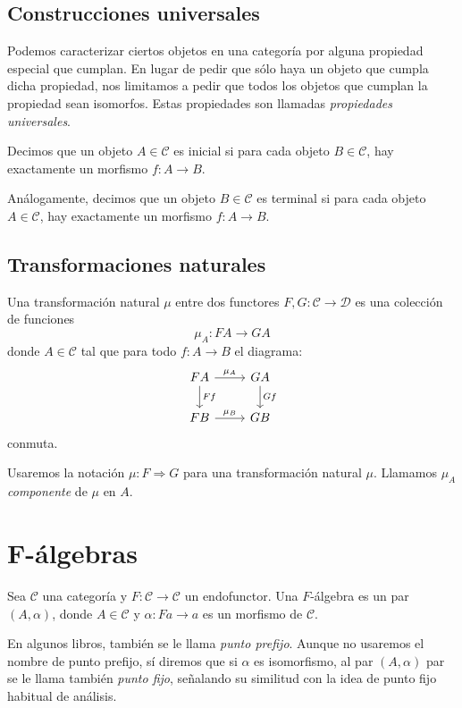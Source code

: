 \documentclass[12pt, twoside]{book}
\newcommand{\cat}{{\mathcal{C}}}
\begin{document}
\section{Construcciones universales}
Podemos caracterizar ciertos objetos en una categoría por alguna propiedad especial que cumplan. En lugar de pedir que sólo haya un objeto que cumpla dicha propiedad, nos limitamos a pedir que todos los objetos que cumplan la propiedad sean isomorfos. Estas propiedades son llamadas \emph{propiedades universales}.

\begin{definition}
Decimos que un objeto $A \in \cat$ es inicial si para cada objeto $B \in \cat$, hay exactamente un morfismo $f \colon A \to B$.

Análogamente, decimos que un objeto $B \in \cat$ es terminal si para cada objeto $A \in \cat$, hay exactamente un morfismo $f \colon A \to B$.
\end{definition}

\section{Transformaciones naturales}
\begin{definition}
Una transformación natural $\mu$ entre dos functores $F, G \colon \cat \to \mathcal{D}$ es una colección de funciones
\[ \mu_A \colon F A \to G A \]
donde $A \in \cat$ tal que para todo $f \colon A \to B$ el diagrama:
\[
\begin{tikzcd}
F A \arrow[r,"\mu_A"] \arrow[d,"F f"] & G A \arrow[d,"G f"]\\
F B \arrow[r,"\mu_B"] & G B
\end{tikzcd}
\]
conmuta.
\end{definition}

Usaremos la notación $\mu \colon F \Rightarrow G$ para una transformación natural $\mu$.
Llamamos $\mu_A$ \emph{componente} de $\mu$ en $A$.

\chapter{F-álgebras}
\begin{definition}
Sea $\cat$ una categoría y $F \colon \cat \to \cat$ un endofunctor.
Una $F$-álgebra es un par $(A,\alpha)$, donde $A \in \cat$ y $\alpha \colon F a \to a$ es un morfismo de $\cat$.
\end{definition}

En algunos libros, también se le llama \emph{punto prefijo}.
Aunque no usaremos el nombre de punto prefijo, sí diremos que si $\alpha$ es isomorfismo, al par $(A,\alpha)$ par se le llama también \emph{punto fijo}, señalando su similitud con la idea de punto fijo habitual de análisis.
\end{document}
